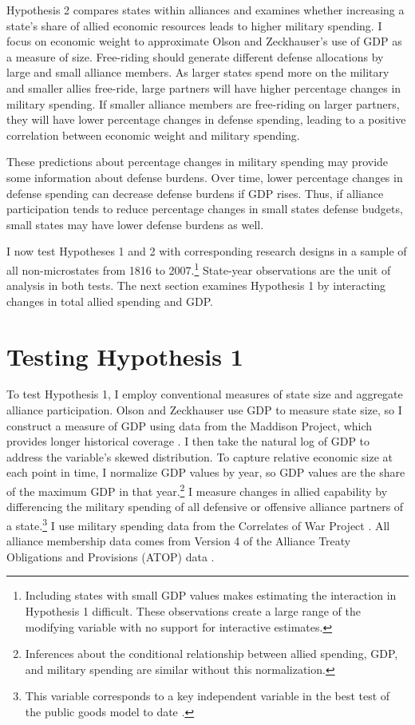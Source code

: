 \documentclass[12pt]{article}
\begin{document}
Hypothesis 2 compares states within alliances and examines whether increasing a state's share of allied economic resources leads to higher military spending. 
I focus on economic weight to approximate Olson and Zeckhauser's use of GDP as a measure of size. 
Free-riding should generate different defense allocations by large and small alliance members. 
As larger states spend more on the military and smaller allies free-ride, large partners will have higher percentage changes in military spending. 
If smaller alliance members are free-riding on larger partners, they will have lower percentage changes in defense spending, leading to a positive correlation between economic weight and military spending.  


These predictions about percentage changes in military spending may provide some information about defense burdens. 
Over time, lower percentage changes in defense spending can decrease defense burdens if GDP rises. 
Thus, if alliance participation tends to reduce percentage changes in small states defense budgets, small states may have lower defense burdens as well. 


I now test Hypotheses 1 and 2 with corresponding research designs in a sample of all non-microstates from 1816 to 2007.\footnote{Including states with small GDP values makes estimating the interaction in Hypothesis 1 difficult. These observations create a large range of the modifying variable with no support for interactive estimates.}
State-year observations are the unit of analysis in both tests.  
The next section examines Hypothesis 1 by interacting changes in total allied spending and GDP.


\section{Testing Hypothesis 1}


To test Hypothesis 1, I employ conventional measures of state size and aggregate alliance participation. 
Olson and Zeckhauser use GDP to measure state size, so I construct a measure of GDP using data from the Maddison Project, which provides longer historical coverage \citep{Boltetal2018}. 
I then take the natural log of GDP to address the variable's skewed distribution. 
To capture relative economic size at each point in time, I normalize GDP values by year, so GDP values are the share of the maximum GDP in that year.\footnote{Inferences about the conditional relationship between allied spending, GDP, and military spending are similar without this normalization.} 
I measure changes in allied capability by differencing the military spending of all defensive or offensive alliance partners of a state.\footnote{This variable corresponds to a key independent variable in the best test of the public goods model to date \citep{PluemperNeumayer2015}.}
I use military spending data from the Correlates of War Project \citep{SingerCINC1988}.  
All alliance membership data comes from Version 4 of the Alliance Treaty Obligations and Provisions (ATOP) data \citep{Leedsetal2002}.  
\end{document}
